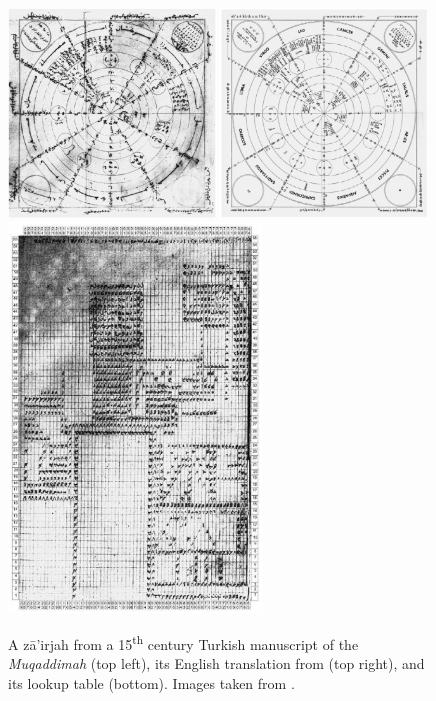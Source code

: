 \begin{figure}
\centering
  
\includegraphics[width=0.49\textwidth]{2_Related_Work/images/zairjah_front.png}
\includegraphics[width=0.49\textwidth]{2_Related_Work/images/zairjah_front_translation.png}\\
\includegraphics[width=0.6\textwidth,angle=90]{2_Related_Work/images/zairjah_back.png}
  
\caption{A z\={a}'irjah from a 15\textsuperscript{th} century Turkish
manuscript of the \textit{Muqaddimah} (top left), its English translation from
\cite{rosenthal1958muqaddimah} (top right), and its lookup table (bottom).
Images taken from \cite{link2010variantology}.}
\label{fig:zairjah}

\end{figure}
